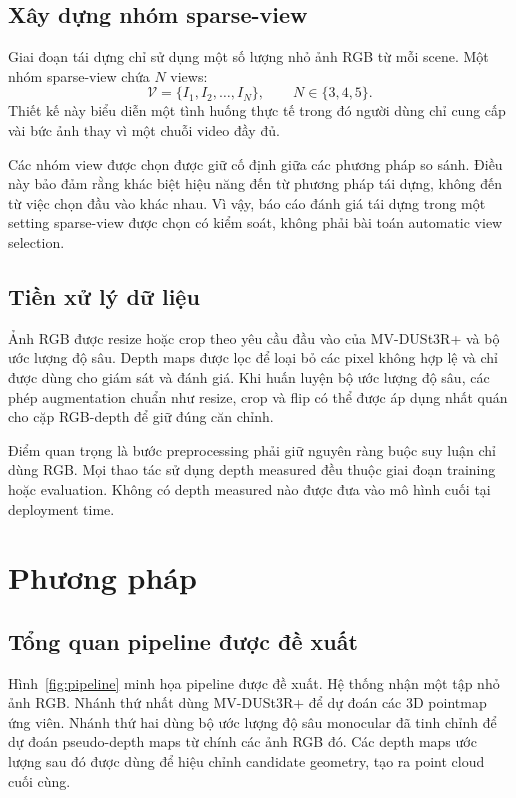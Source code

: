 \documentclass[12pt,a4paper]{article}
\newcommand{\mvdp}{MV-DUSt3R+}
\begin{document}
\subsection{Xây dựng nhóm sparse-view}
Giai đoạn tái dựng chỉ sử dụng một số lượng nhỏ ảnh RGB từ mỗi scene. Một nhóm sparse-view chứa $N$ views:
\begin{equation}
\mathcal{V}=\{I_1,I_2,\ldots,I_N\}, \qquad N \in \{3,4,5\}.
\end{equation}
Thiết kế này biểu diễn một tình huống thực tế trong đó người dùng chỉ cung cấp vài bức ảnh thay vì một chuỗi video đầy đủ.

Các nhóm view được chọn được giữ cố định giữa các phương pháp so sánh. Điều này bảo đảm rằng khác biệt hiệu năng đến từ phương pháp tái dựng, không đến từ việc chọn đầu vào khác nhau. Vì vậy, báo cáo đánh giá tái dựng trong một setting sparse-view được chọn có kiểm soát, không phải bài toán automatic view selection.

\subsection{Tiền xử lý dữ liệu}
Ảnh RGB được resize hoặc crop theo yêu cầu đầu vào của \mvdp{} và bộ ước lượng độ sâu. Depth maps được lọc để loại bỏ các pixel không hợp lệ và chỉ được dùng cho giám sát và đánh giá. Khi huấn luyện bộ ước lượng độ sâu, các phép augmentation chuẩn như resize, crop và flip có thể được áp dụng nhất quán cho cặp RGB-depth để giữ đúng căn chỉnh.

Điểm quan trọng là bước preprocessing phải giữ nguyên ràng buộc suy luận chỉ dùng RGB. Mọi thao tác sử dụng depth measured đều thuộc giai đoạn training hoặc evaluation. Không có depth measured nào được đưa vào mô hình cuối tại deployment time.

\section{Phương pháp}
\subsection{Tổng quan pipeline được đề xuất}
Hình~\ref{fig:pipeline} minh họa pipeline được đề xuất. Hệ thống nhận một tập nhỏ ảnh RGB. Nhánh thứ nhất dùng \mvdp{} để dự đoán các 3D pointmap ứng viên. Nhánh thứ hai dùng bộ ước lượng độ sâu monocular đã tinh chỉnh để dự đoán pseudo-depth maps từ chính các ảnh RGB đó. Các depth maps ước lượng sau đó được dùng để hiệu chỉnh candidate geometry, tạo ra point cloud cuối cùng.
\end{document}
